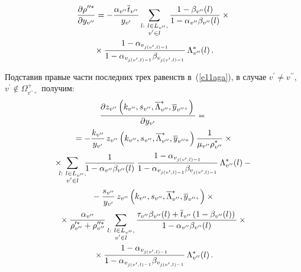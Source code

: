\begin{multicols}{2}
     \vspace*{-12pt}
     
     \noindent
  \begin{multline*}
      \displaystyle\frac{\displaystyle \partial \rho_{}^{\prime\prime *}\mathstrut}{\displaystyle \partial y_{v^{\prime\prime}}\mathstrut}=
      -\displaystyle\frac{\displaystyle \alpha_{ v^{\prime\prime}} \overline{t}_{ v^{\prime\prime}}\mathstrut}{\displaystyle y_{v^\prime}\mathstrut}
      \sum\limits_{\substack{{l:\ l\in L_{ v^{\prime\prime}},}\\ {v^\prime\in l}}}
      \displaystyle\frac{\displaystyle 1-\beta_{ v^{\prime\prime}}(l)\mathstrut}{\displaystyle 1-\alpha_{ v^{\prime\prime}}\beta_{v^{\prime\prime}}(l)\mathstrut}\times{}\\
      {}\times
      \displaystyle\frac{\displaystyle 1-\alpha_{v_{j(v^\prime,l)-1}}\mathstrut}{\displaystyle 1-\alpha_{ v_{j(v^\prime,l)-1}}\beta_{ 
v_{j(v^\prime,l)-1}}\mathstrut}\, \Lambda^*_{ v^{\prime\prime}}(l)\,.
     \end{multline*}
   
   Подставив правые части последних трех равенств в~(\ref{e11aga}), в 
случае $v^\prime\not= v^{\prime\prime}$, $v^\prime\not\in 
\Omega^+_{v^{\prime\prime +}}$ получим:
   \begin{multline}
   \displaystyle\frac{\displaystyle \partial z_{ v^{\prime\prime}}\left(k_{ v^{\prime\prime}}, s_{ 
v^{\prime\prime}}, \overline{\Lambda}^*_{ v^{\prime\prime}}, \overline{y}_{ 
v^{\prime\prime +}}\right)\mathstrut}{\displaystyle \partial y_{v^\prime}\mathstrut}={}\\
{}=-
\displaystyle\frac{\displaystyle k_{v^{\prime\prime}}\mathstrut}{\displaystyle y_{v^\prime}\mathstrut}\,z_{v^{\prime\prime}}
\left(k_{v^{\prime\prime}}, s_{ v^{\prime\prime}}, 
\overline{\Lambda}_{v^{\prime\prime}}^*, \overline{y}_{ v^{\prime\prime +}}\right)
   \displaystyle\frac{\displaystyle 1\mathstrut}{\displaystyle \mu_{ v^{\prime\prime}}\rho^*_{ v^{\prime\prime}}\mathstrut}\times{}\\
   \hspace*{-1pt}{}\times\hspace*{-5.5pt}
   \sum\limits_{\substack{{l:\ l\in L_{ v^{\prime\prime}},}\\ {v^\prime\in l}}} \hspace*{-4pt}
   \displaystyle\frac{\displaystyle 1\mathstrut}{\displaystyle 1-\alpha_{ v^{\prime\prime}}\beta_{v^{\prime\prime}}(l)\mathstrut}\,
   \displaystyle\frac{\displaystyle 1-\alpha_{v_{j(v^\prime,l)-1}}\mathstrut}{\displaystyle 1-\alpha_{ v_{j(v^\prime,l)-1}}
   \beta_{{v_{j(v^\prime,l)-1}}}\mathstrut}\,\Lambda^*_{ v^{\prime\prime}}(l)-{}\\
   {}-
   \displaystyle\frac{\displaystyle s_{ v^{\prime\prime}}\mathstrut}{\displaystyle y_{v^\prime}\mathstrut}\,z_{v^{\prime\prime}}
   \left(k_{ v^{\prime\prime}}, s_{ v^{\prime\prime}}, \overline{\Lambda}^*_{ 
v^{\prime\prime}}, \overline{y}_{ v^{\prime\prime +}}\right)\times{}\\
   {}\times \displaystyle\frac{\displaystyle \alpha_{ v^{\prime\prime}}\mathstrut}{\displaystyle \rho_{ v^{\prime\prime}}^{\prime 
*}+\rho_{ v^{\prime\prime}}^{\prime\prime *}\mathstrut}
   \sum\limits_{\substack{{l:\ l\in L_{ v^{\prime\prime}},}\\ {v^\prime\in l}}}
   \displaystyle\frac{\displaystyle \tau_{ v^{\prime\prime}} \beta_{ v^{\prime\prime}}(l) +\overline{t}_{ 
v^{\prime\prime}} \left(1-\beta_{ v^{\prime\prime}}(l)\right)\mathstrut}{\displaystyle 1-
\alpha_{v^{\prime\prime}}\beta_{ v^{\prime\prime}}(l)\mathstrut}\times{}\\
{}\times
\displaystyle\frac{\displaystyle 1- \alpha_{v_{j(v^\prime,l)-1}}\mathstrut}{\displaystyle 1-\alpha_{v_{j(v^\prime,l)-
1}}\beta_{v_{j(v^\prime,l)-1}}\mathstrut}\,\Lambda^*_{ v^{\prime\prime}}(l)\,.
   \label{e13aga}
   \end{multline}
   
   \end{multicols}
   
